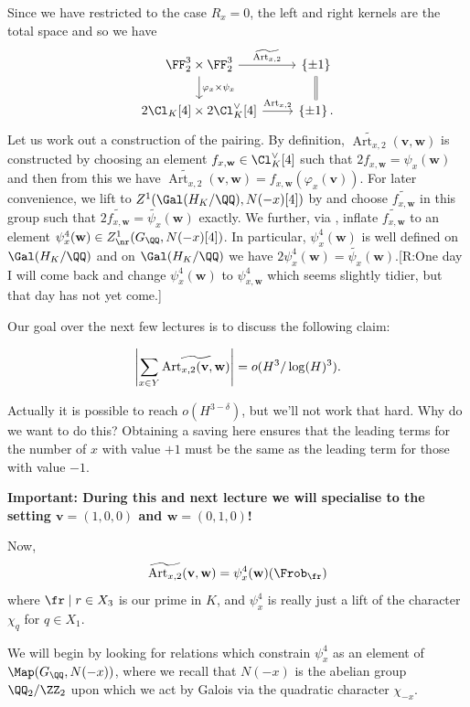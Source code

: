 \documentclass{lecturenotes}
\newcommand{\ross}[1]{{\color{red}[R:#1]}}
\newcommand{\Art}{\operatorname{Art}}
\newcommand{\bv}{\mathbf{v}}
\newcommand{\bw}{\mathbf{w}}
\numberwithin{equation}{section}
\begin{document}
Since we have restricted to the case $R_x=0$, the left and right kernels are the total space and so we have
\[\begin{tikzcd}
    \FF_2^3\times \FF_2^3\ar[r,"\widetilde{\Art_{x,2}}"]\ar[d,"\varphi_x\times \psi_x"]&\set{\pm 1}\ar[d,equals]\\
    2\Cl_K[4]\times 2\Cl_K^\vee[4]\ar[r,"\Art_{x,2}"]&\set{\pm 1}.
\end{tikzcd}\]
Let us work out a construction of the pairing.  By definition, $\widetilde{\Art_{x,2}}(\bv,\bw)$ is constructed by choosing an element $f_{x,\bw}\in \Cl_K^\vee[4]$ such that $2f_{x,\bw}=\psi_x(\bw)$ and then from this we have $\widetilde{\Art_{x,2}}(\bv,\bw)=f_{x,\bw}(\varphi_x(\bv))$.  For later convenience, we lift to $Z^1(\Gal(H_K/\QQ),N(-x)[4])$ by  and choose $\widetilde{f_{x,\bw}}$ in this group such that $2\widetilde{f_{x,\bw}}=\widetilde{\psi_x}(\bw)$ exactly.  We further, via , inflate $\widetilde{f_{x,\bw}}$ to an element $\psi_{x}^4(\bw)\in Z^1_{\nr}(G_\QQ, N(-x)[4])$.  In particular, $\psi_{x}^4(\bw)$ is well defined on $\Gal(H_K/\QQ)$ and on $\Gal(H_K/\QQ)$ we have $2\psi_{x}^4(\bw)=\widetilde{\psi_{x}}(\bw)$.\ross{One day I will come back and change $\psi_{x}^4(\bw)$ to $\psi_{x,\bw}^4$ which seems slightly tidier, but that day has not yet come.}

Our goal over the next few lectures is to discuss the following claim:
\begin{theorem}
\[\abs{\sum_{x\in Y}\widetilde{\Art_{x,2}(\bv,\bw)}}=o(H^3/\log(H)^3).\] 
\end{theorem}
Actually it is possible to reach $o(H^{3-\delta})$, but we'll not work that hard.  Why do we want to do this?  Obtaining a saving here ensures that the leading terms for the number of $x$ with value $+1$ must be the same as the leading term for those with value $-1$.

\noindent \textbf{Important: During this and next lecture we will specialise to the setting $\bv=(1,0,0)$ and $\bw=(0,1,0)$!}

Now,
\[\widetilde{\Art_{x,2}}(\bv,\bw)=\psi_x^4(\bw)(\Frob_\fr)\]
where $\fr\mid r\in X_3$ is our prime in $K$, and $\psi_x^4$ is really just a lift of the character $\chi_q$ for $q\in X_1$.

We will begin by looking for relations which constrain $\psi_x^4$ as an element of $\Map(G_\QQ, N(-x))$, where we recall that $N(-x)$ is the abelian group $\QQ_2/\ZZ_2$ upon which we act by Galois via the quadratic character $\chi_{-x}$.
\end{document}
